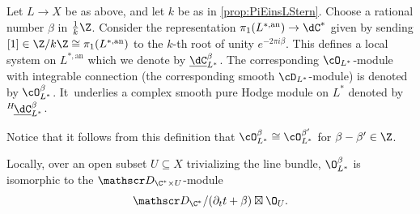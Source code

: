 \begin{dfn}\label{def:Obeta-new}
Let $L\to X$ be as above, and let $k$ be as in \cref{prop:PiEinsLStern}.
Choose a rational number $\beta$ in $\frac{1}{k}\Z$. Consider the representation $\pi_1(L^{*,\mathrm{an}}) \to \dC^*$ given by sending $[1]\in\Z/k\Z \cong\pi_1(L^{*,\mathrm{an}})$ to the $k$-th root of unity
$e^{-2\pi i \beta}$. This defines a local system on $L^{*,\mathrm{an}}$ which we denote by $\underline{\dC}^\beta_{L^*}$. The corresponding $\cO_{L^*}$\nobreakdash-mod\-ule with integrable connection
(\ie the corresponding smooth $\cD_{L^*}$\nobreakdash-mod\-ule) is denoted
by $\cO_{L^*}^\beta$. It~underlies a complex smooth pure Hodge module on $L^*$ denoted by $^{H\!}\underline{\dC}^\beta_{L^*}$.
\end{dfn}
Notice that it follows from this definition that $\cO_{L^*}^\beta\cong \cO_{L^*}^{\beta'}$ for $\beta-\beta'\in \Z$.

\begin{prop}\label{prop:ObetaExtProd}
Locally, over an open subset $U \subseteq X$ trivializing the line bundle, $\O_{L^*}^\beta$ is isomorphic to the $\mathscr D_{\C^* \times U}$\nobreakdash-mod\-ule
\[
\mathscr D_{\C^*}/(\partial_t t + \beta) \boxtimes \O_U.
\]
\end{prop}

